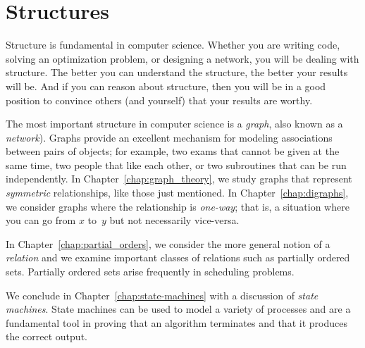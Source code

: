 \part{Structures}
\label{part:structures}

\partintro

Structure is fundamental in computer science.  Whether you are writing
code, solving an optimization problem, or designing a network, you
will be dealing with structure.  The better you can understand the
structure, the better your results will be.  And if you can reason
about structure, then you will be in a good position to convince
others (and yourself) that your results are worthy.

The most important structure in computer science is a \emph{graph},
also known as a \emph{network}).  Graphs provide an excellent
mechanism for modeling associations between pairs of objects; for
example, two exams that cannot be given at the same time, two people
that like each other, or two subroutines that can be run
independently.  In Chapter~\ref{chap:graph_theory}, we study graphs
that represent \emph{symmetric} relationships, like those just
mentioned.  In Chapter~\ref{chap:digraphs}, we consider graphs where
the relationship is \emph{one-way}; that is, a situation where you can
go from $x$ to~$y$ but not necessarily vice-versa.

In Chapter~\ref{chap:partial_orders}, we consider the more general
notion of a \emph{relation} and we examine important classes of
relations such as partially ordered sets.  Partially ordered sets
arise frequently in scheduling problems.

We conclude in Chapter~\ref{chap:state-machines} with a discussion of
\emph{state machines}.  State machines can be used to model a variety
of processes and are a fundamental tool in proving that an algorithm
terminates and that it produces the correct output.

\endinput
